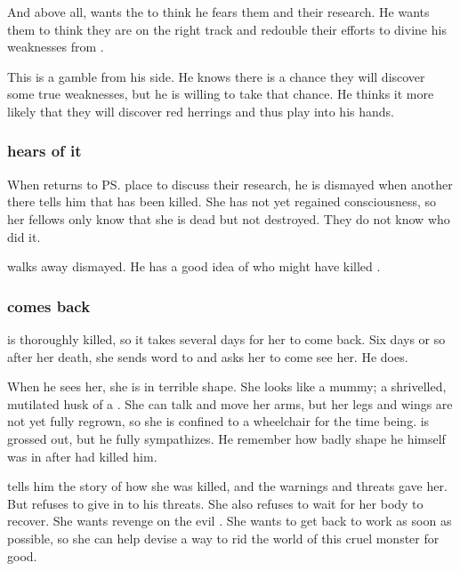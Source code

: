 \begin{garbage}
And above all, \Ishnaruchaefir{} wants the \resphain{} to think he fears them and their research. 
He wants them to think they are on the right track and redouble their efforts to divine his weaknesses from \emph{\WanderersInDarkness}. 

This is a gamble from his side. 
He knows there is a chance they will discover some true weaknesses, but he is willing to take that chance. 
He thinks it more likely that they will discover red herrings and thus play into his hands. 





\subsubsection{\Teshrial{} hears of it}
When \Teshrial{} returns to \ps{\Urizeth} place to discuss their research, he is dismayed when another \resphan{} there tells him that \Urizeth{} has been killed. 
She has not yet regained consciousness, so her fellows only know that she is dead but not destroyed. 
They do not know who did it. 

\Teshrial{} walks away dismayed. 
He has a good idea of who might have killed \Urizeth{}. 






\subsubsection{\Urizeth{} comes back}
\Urizeth{} is thoroughly killed, so it takes several days for her to come back. 
Six days or so after her death, she sends word to \Teshrial{} and asks her to come see her. 
He does. 

When he sees her, she is in terrible shape. 
She looks like a mummy; a shrivelled, mutilated husk of a \resvil. 
She can talk and move her arms, but her legs and wings are not yet fully regrown, so she is confined to a wheelchair for the time being. 
\Teshrial{} is grossed out, but he fully sympathizes. 
He remember how badly shape he himself was in after \Ishnaruchaefir{} had killed him. 

\Urizeth{} tells him the story of how she was killed, and the warnings and threats \Ishnaruchaefir{} gave her. 
But \Urizeth{} refuses to give in to his threats. 
She also refuses to wait for her body to recover. 
She wants revenge on the evil \dragon. 
She wants to get back to work as soon as possible, so she can help \Teshrial{} devise a way to rid the world of this cruel monster for good. 







\end{garbage}
